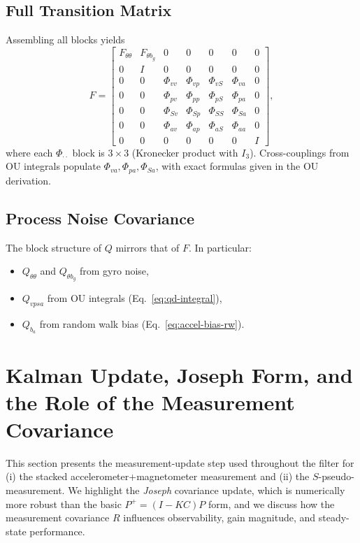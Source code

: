 \documentclass[10pt]{extarticle}
\begin{document}
\subsection{Full Transition Matrix}
Assembling all blocks yields
\begin{equation}
F =
\begin{bmatrix}
F_{\theta\theta} & F_{\theta b_g} & 0 & 0 & 0 & 0 & 0\\
0 & I & 0 & 0 & 0 & 0 & 0\\
0 & 0 & \Phi_{vv} & \Phi_{vp} & \Phi_{vS} & \Phi_{va} & 0\\
0 & 0 & \Phi_{pv} & \Phi_{pp} & \Phi_{pS} & \Phi_{pa} & 0\\
0 & 0 & \Phi_{Sv} & \Phi_{Sp} & \Phi_{SS} & \Phi_{Sa} & 0\\
0 & 0 & \Phi_{av} & \Phi_{ap} & \Phi_{aS} & \Phi_{aa} & 0\\
0 & 0 & 0 & 0 & 0 & 0 & I
\end{bmatrix},
\label{eq:F-full}
\end{equation}
where each $\Phi_{\cdot\cdot}$ block is $3\times 3$ (Kronecker product with $I_3$).
Cross-couplings from OU integrals populate $\Phi_{va},\Phi_{pa},\Phi_{Sa}$,
with exact formulas given in the OU derivation.

\subsection{Process Noise Covariance}
The block structure of $Q$ mirrors that of $F$. In particular:
\begin{itemize}
\item $Q_{\theta\theta}$ and $Q_{\theta b_g}$ from gyro noise,
\item $Q_{vpsa}$ from OU integrals (Eq.~\ref{eq:qd-integral}),
\item $Q_{b_a}$ from random walk bias (Eq.~\ref{eq:accel-bias-rw}).
\end{itemize}

\section{Kalman Update, Joseph Form, and the Role of the Measurement Covariance}
\label{sec:kalman-update}

This section presents the measurement-update step used throughout the filter for (i) the stacked
accelerometer+magnetometer measurement and (ii) the $S$-pseudo-measurement. We highlight the
\emph{Joseph} covariance update, which is numerically more robust than the basic $P^+=(I-KC)P$ form,
and we discuss how the measurement covariance $R$ influences observability, gain magnitude, and
steady-state performance.
\end{document}
